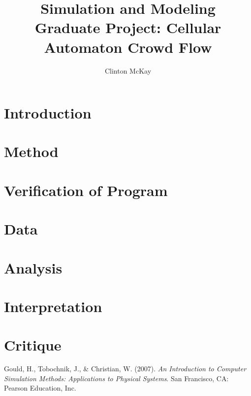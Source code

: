 \documentclass{article}%
\begin{document}
    \title{Simulation and Modeling\\Graduate Project: Cellular Automaton Crowd Flow}
    \author{Clinton McKay}
    \maketitle

    \twocolumn

    \section{Introduction}

    \section{Method}

    \section{Verification of Program}

    \section{Data}
    
    \section{Analysis}

    \section{Interpretation}

    \section{Critique}
    
    \begin{thebibliography}{1}
            Gould, H., Tobochnik, J., \& Christian, W. (2007). \textit{An Introduction to Computer Simulation Methods: Applications to Physical Systems}. San Francisco, CA: Pearson Education, Inc.
    \end{thebibliography} 
\end{document}
